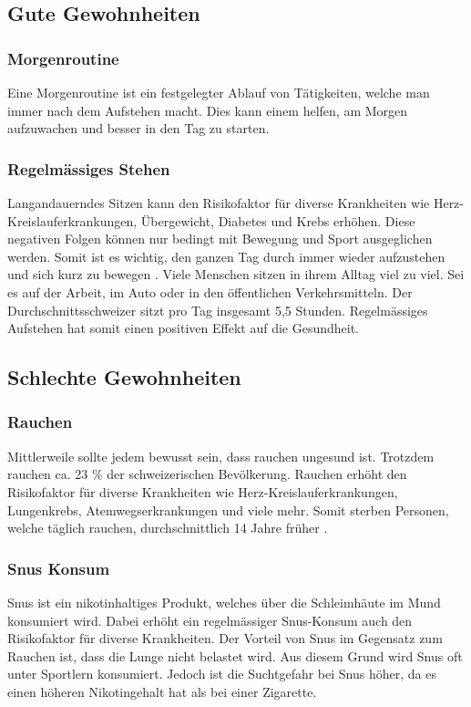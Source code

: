 \subsection{Gute Gewohnheiten}
\subsubsection{Morgenroutine}
Eine Morgenroutine ist ein festgelegter Ablauf von Tätigkeiten, welche man immer nach dem Aufstehen macht.
\newline
Dies kann einem helfen, am Morgen aufzuwachen und besser in den Tag zu starten.
\subsubsection{Regelmässiges Stehen}
Langandauerndes Sitzen kann den Risikofaktor für diverse Krankheiten wie Herz-Kreislauferkrankungen, Übergewicht, Diabetes und Krebs erhöhen. Diese negativen Folgen können nur bedingt mit Bewegung und Sport ausgeglichen werden. Somit ist es wichtig, den ganzen Tag durch immer wieder aufzustehen und sich kurz zu bewegen \cite{bundesamtfrgesundheitbag_2020_aufstehen}.
\newline
Viele Menschen sitzen in ihrem Alltag viel zu viel. Sei es auf der Arbeit, im Auto oder in den öffentlichen Verkehrsmitteln. Der Durchschnittsschweizer sitzt pro Tag insgesamt 5,5 Stunden.
\newline
Regelmässiges Aufstehen hat somit einen positiven Effekt auf die Gesundheit.
\subsection{Schlechte Gewohnheiten}
\subsubsection{Rauchen}
Mittlerweile sollte jedem bewusst sein, dass rauchen ungesund ist. Trotzdem rauchen ca. 23 \% der schweizerischen Bevölkerung.
\newline
Rauchen erhöht den Risikofaktor für diverse Krankheiten wie Herz-Kreislauferkrankungen, Lungenkrebs, Atemwegserkrankungen und viele mehr. Somit sterben Personen, welche täglich rauchen, durchschnittlich 14 Jahre früher \cite{bundesamtfrgesundheitbag_2015_tabak}.
\subsubsection{Snus Konsum}
Snus ist ein nikotinhaltiges Produkt, welches über die Schleimhäute im Mund konsumiert wird. Dabei erhöht ein regelmässiger Snus-Konsum auch den Risikofaktor für diverse Krankheiten.
\newline
Der Vorteil von Snus im Gegensatz zum Rauchen ist, dass die Lunge nicht belastet wird. Aus diesem Grund wird Snus oft unter Sportlern konsumiert. Jedoch ist die Suchtgefahr bei Snus höher, da es einen höheren Nikotingehalt hat als bei einer Zigarette.
